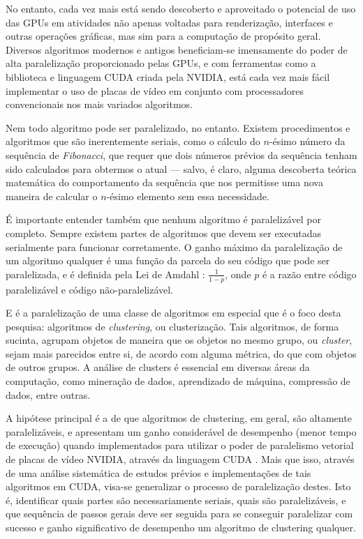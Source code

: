 \documentclass[12pt, %
openright, 
oneside, %
a4paper,    %
brazil]{facom-ufu-abntex2}
\begin{document}
No entanto, cada vez mais está sendo descoberto e aproveitado o potencial de uso das GPUs em atividades não apenas voltadas para renderização, interfaces e outras operações gráficas, mas sim para a computação de propósito geral. Diversos algoritmos modernos e antigos beneficiam-se imensamente do poder de alta paralelização proporcionado pelas GPUs, e com ferramentas como a biblioteca e linguagem CUDA criada pela NVIDIA, está cada vez mais fácil implementar o uso de placas de vídeo em conjunto com processadores convencionais nos mais variados algoritmos.


Nem todo algoritmo pode ser paralelizado, no entanto. Existem procedimentos e algoritmos que são inerentemente seriais, como o cálculo do $n$-ésimo número da sequência de \textit{Fibonacci}, que requer que dois números prévios da sequência tenham sido calculados para obtermos o atual --- salvo, é claro, alguma descoberta teórica matemática do comportamento da sequência que nos permitisse uma nova maneira de calcular o $n$-ésimo elemento sem essa necessidade.

É importante entender também que nenhum algoritmo é paralelizável por completo. Sempre existem partes de algoritmos que devem ser executadas serialmente para funcionar corretamente. O ganho máximo da paralelização de um algoritmo qualquer é uma função da parcela do seu código que pode ser paralelizada, e é definida pela Lei de Amdahl \cite{Amdahl-Law}: $\frac{1}{1-p}$, onde $p$ é a razão entre código paralelizável e código não-paralelizável.

E é a paralelização de uma classe de algoritmos em especial que é o foco desta pesquisa: algoritmos de \textit{clustering}, ou clusterização. Tais algoritmos, de forma sucinta, agrupam objetos de maneira que os objetos no mesmo grupo, ou \textit{cluster}, sejam mais parecidos entre si, de acordo com alguma métrica, do que com objetos de outros grupos. A análise de clusters é essencial em diversas áreas da computação, como mineração de dados, aprendizado de máquina, compressão de dados, entre outras.


A hipótese principal é a de que algoritmos de clustering, em geral, são altamente paralelizáveis, e apresentam um ganho considerável de desempenho (menor tempo de execução) quando implementados para utilizar o poder de paralelismo vetorial de placas de vídeo NVIDIA, através da linguagem CUDA \cite{CUDAZone}. Mais que isso, através de uma análise sistemática de estudos prévios e implementações de tais algoritmos em CUDA, visa-se generalizar o processo de paralelização destes. Isto é, identificar quais partes são necessariamente seriais, quais são paralelizáveis, e que sequência de passos gerais deve ser seguida para se conseguir paralelizar com sucesso e ganho significativo de desempenho um algoritmo de clustering qualquer.
\end{document}
